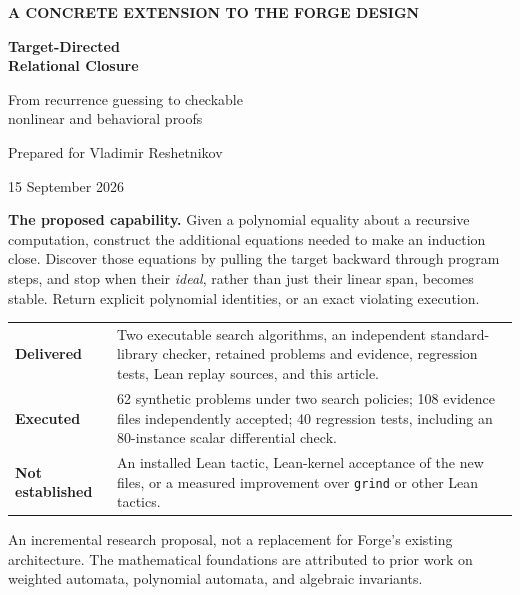 \documentclass[11pt,letterpaper]{article}
\theoremstyle{definition}
\newcommand{\code}[1]{\nolinkurl{#1}}
\begin{document}
\begin{titlepage}
\vspace*{.5in}
{\small\bfseries\color{accent}A CONCRETE EXTENSION TO THE FORGE DESIGN\par}
\vspace{.25in}
{\fontsize{30}{35}\selectfont\bfseries\color{ink}Target-Directed\\Relational Closure\par}
\vspace{.22in}
{\Large From recurrence guessing to checkable\\nonlinear and behavioral proofs\par}
\vspace{.35in}
{\large Prepared for Vladimir Reshetnikov\par}
{\color{muted}15 September 2026\par}
\vspace{.4in}
\begin{focusbox}
\textbf{The proposed capability.} Given a polynomial equality about a recursive
computation, construct the additional equations needed to make an induction
close. Discover those equations by pulling the target backward through program
steps, and stop when their \emph{ideal}, rather than just their linear span,
becomes stable. Return explicit polynomial identities, or an exact violating
execution.
\end{focusbox}
\vspace{.18in}
\begin{tabularx}{\linewidth}{@{}lY@{}}
\toprule
\textbf{Delivered} & Two executable search algorithms, an independent standard-library
checker, retained problems and evidence, regression tests, Lean replay sources,
and this article.\\[.6em]
\textbf{Executed} & 62 synthetic problems under two search policies; 108 evidence
files independently accepted; 40 regression tests, including an 80-instance
scalar differential check.\\[.6em]
\textbf{Not established} & An installed Lean tactic, Lean-kernel acceptance of the
new files, or a measured improvement over \code{grind} or other Lean tactics.\\
\bottomrule
\end{tabularx}
\vfill
{\small\color{muted}An incremental research proposal, not a replacement for Forge's
existing architecture. The mathematical foundations are attributed to prior
work on weighted automata, polynomial automata, and algebraic invariants.}
\end{titlepage}
\end{document}
